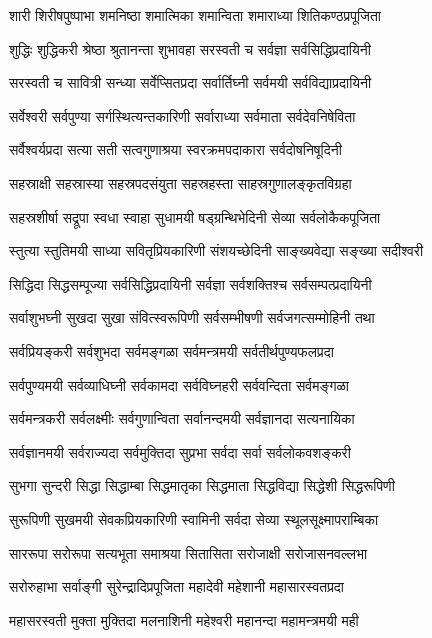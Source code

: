 \twolineshloka
{शारी शिरीषपुष्पाभा शमनिष्ठा शमात्मिका}
{शमान्विता शमाराध्या शितिकण्ठप्रपूजिता}%

\twolineshloka
{शुद्धिः शुद्धिकरी श्रेष्ठा श्रुतानन्ता शुभावहा}
{सरस्वती च सर्वज्ञा सर्वसिद्धिप्रदायिनी}%

\twolineshloka
{सरस्वती च सावित्री सन्ध्या सर्वेप्सितप्रदा}
{सर्वार्तिघ्नी सर्वमयी सर्वविद्याप्रदायिनी}%

\twolineshloka
{सर्वेश्वरी सर्वपुण्या सर्गस्थित्यन्तकारिणी}
{सर्वाराध्या सर्वमाता सर्वदेवनिषेविता}%

\twolineshloka
{सर्वैश्वर्यप्रदा सत्या सती सत्वगुणाश्रया}
{स्वरक्रमपदाकारा सर्वदोषनिषूदिनी}%

\twolineshloka
{सहस्राक्षी सहस्रास्या सहस्रपदसंयुता}
{सहस्रहस्ता साहस्रगुणालङ्कृतविग्रहा}%

\twolineshloka
{सहस्रशीर्षा सद्रूपा स्वधा स्वाहा सुधामयी}
{षड्ग्रन्थिभेदिनी सेव्या सर्वलोकैकपूजिता}%

\twolineshloka
{स्तुत्या स्तुतिमयी साध्या सवितृप्रियकारिणी}
{संशयच्छेदिनी साङ्ख्यवेद्या सङ्ख्या सदीश्वरी}%

\twolineshloka
{सिद्धिदा सिद्धसम्पूज्या सर्वसिद्धिप्रदायिनी}
{सर्वज्ञा सर्वशक्तिश्च सर्वसम्पत्प्रदायिनी}%

\twolineshloka
{सर्वाशुभघ्नी सुखदा सुखा संवित्स्वरूपिणी}
{सर्वसम्भीषणी सर्वजगत्सम्मोहिनी तथा}%

\twolineshloka
{सर्वप्रियङ्करी सर्वशुभदा सर्वमङ्गळा}
{सर्वमन्त्रमयी सर्वतीर्थपुण्यफलप्रदा}%

\twolineshloka
{सर्वपुण्यमयी सर्वव्याधिघ्नी सर्वकामदा}
{सर्वविघ्नहरी सर्ववन्दिता सर्वमङ्गळा}%

\twolineshloka
{सर्वमन्त्रकरी सर्वलक्ष्मीः सर्वगुणान्विता}
{सर्वानन्दमयी सर्वज्ञानदा सत्यनायिका}%

\twolineshloka
{सर्वज्ञानमयी सर्वराज्यदा सर्वमुक्तिदा}
{सुप्रभा सर्वदा सर्वा सर्वलोकवशङ्करी}%

\twolineshloka
{सुभगा सुन्दरी सिद्धा सिद्धाम्बा सिद्धमातृका}
{सिद्धमाता सिद्धविद्या सिद्धेशी सिद्धरूपिणी}%

\twolineshloka
{सुरूपिणी सुखमयी सेवकप्रियकारिणी}
{स्वामिनी सर्वदा सेव्या स्थूलसूक्ष्मापराम्बिका}%

\twolineshloka
{साररूपा सरोरूपा सत्यभूता समाश्रया}
{सितासिता सरोजाक्षी सरोजासनवल्लभा}%

\twolineshloka
{सरोरुहाभा सर्वाङ्गी सुरेन्द्रादिप्रपूजिता}
{महादेवी महेशानी महासारस्वतप्रदा}%

\twolineshloka
{महासरस्वती मुक्ता मुक्तिदा मलनाशिनी}
{महेश्वरी महानन्दा महामन्त्रमयी मही}%

